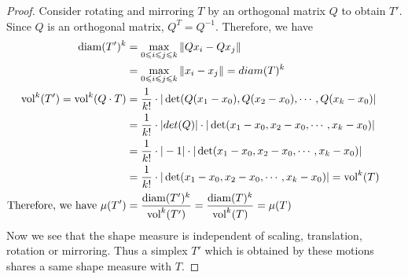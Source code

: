 \begin{proof}
    Consider rotating and mirroring $T$ by an orthogonal matrix $Q$ to obtain $T'$. Since $Q$ is an orthogonal matrix, $Q^T = Q^{-1}$. Therefore, we have
    \begin{align*}
    \operatorname{diam}(T')^k &= \max_{0\leqslant i\leqslant j\leqslant k} \|Qx_i - Qx_j\|\\
               &= \max_{0\leqslant i\leqslant j\leqslant k} \|x_i - x_j\| = diam(T)^k&&\\
    \operatorname{vol}^k(T') = \operatorname{vol}^k(Q\cdot T) &= \frac{1}{k!}\cdot |\det(Q(x_1-x_0), Q(x_2-x_0),\cdots, Q(x_k-x_0)|\\
                                &= \frac{1}{k!}\cdot|det(Q)|\cdot|\det(x_1-x_0, x_2-x_0, \cdots, x_k-x_0)|\\
                                &= \frac{1}{k!}\cdot|-1|\cdot|\det(x_1-x_0, x_2-x_0, \cdots, x_k-x_0)|\\
                                &= \frac{1}{k!}\cdot|\det(x_1-x_0, x_2-x_0, \cdots, x_k-x_0)| = \operatorname{vol}^k(T)\\
    \text{Therefore, we have } \mu(T') &= \frac{\operatorname{diam}(T')^k}{\operatorname{vol}^k(T')} = \frac{\operatorname{diam}(T)^k}{\operatorname{vol}^k(T)} = \mu(T)
    \end{align*}
    Now we see that the shape measure is independent of scaling, translation, rotation or mirroring. Thus a simplex $T'$ which is obtained by these motions shares a same shape measure with $T$.
    \end{proof}